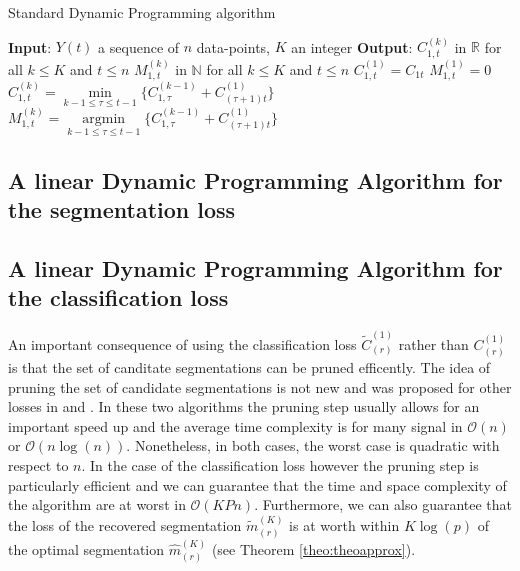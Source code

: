 \documentclass{llncs}
\begin{document}
\begin{algorithm}
  \caption{Standard Dynamic Programming algorithm}\label{algo:DPA2}
  \begin{algorithmic}
    \State \textbf{Input}: $Y(t)$ a sequence of $n$ data-points, $K$ an integer
    \State \textbf{Output}: $C^{(k)}_{1,t}$ in $\mathbb{R}$ for all $k \leq K$ and $t \leq n$
    \State $M^{(k)}_{1,t}$ in $\mathbb{N}$ for all $k \leq K$ and $t \leq n$
         \State $C^{(1)}_{1,t} = C_{1t}$ 
         \State $M^{(1)}_{1,t} = 0$  
    \EndFor
     	\State $C^{(k)}_{1,t} = \underset{k-1 \leq \tau \leq t-1}{\min} \{ C^{(k-1)}_{1,\tau}+ C_{(\tau+1)t}^{(1)} \}$ 
        \State $M^{(k)}_{1,t} =\underset{k-1 \leq \tau \leq t-1}{\operatorname{argmin}} \{ C^{(k-1)}_{1,\tau}+ C_{(\tau+1)t}^{(1)} \}$ 
        \EndFor
   
     \EndFor
  \end{algorithmic}
\end{algorithm}

\subsection{A linear Dynamic Programming Algorithm for the segmentation loss}

\subsection{A linear Dynamic Programming Algorithm for the classification loss}

An important consequence of using the classification loss $\widetilde{C}_{(r)}^{(1)}$ rather than ${C}_{(r)}^{(1)}$ is that the set of canditate segmentations 
can be pruned efficently. The idea of pruning the set of candidate segmentations
is not new and was proposed for other losses in \cite{rigaill_2010} and \cite{killick_optimal_2011}.
In these two algorithms the pruning step usually allows for an important speed up and the average time complexity is for many signal in $\mathcal{O}(n)$ or  $\mathcal{O}(n\log(n))$. Nonetheless, in both cases, the worst case is quadratic with respect to $n$.
In the case of the classification loss however the pruning step is particularly 
efficient %
and we can guarantee that the time and space complexity of the algorithm are at worst in $\mathcal{O}(KPn)$. 
Furthermore, we can also guarantee that the loss of the recovered segmentation $\widetilde{m}_{(r)}^{(K)}$ is at worth within $K \log(p)$ of the optimal segmentation $\widehat{m}_{(r)}^{(K)}$ (see Theorem \ref{theo:theoapprox}). \\
\end{document}

